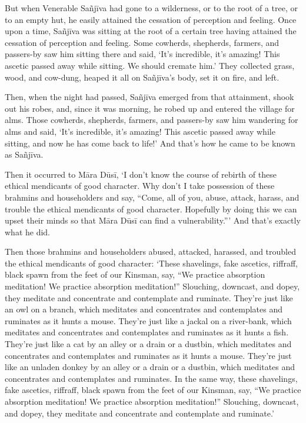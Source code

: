 \documentclass[12pt,openany]{book}%
\begin{document}
But when Venerable \textsanskrit{Sañjīva} had gone to a wilderness, or to the root of a tree, or to an empty hut, he easily attained the cessation of perception and feeling. Once upon a time, \textsanskrit{Sañjīva} was sitting at the root of a certain tree having attained the cessation of perception and feeling. Some cowherds, shepherds, farmers, and passers-by saw him sitting there and said, ‘It’s incredible, it’s amazing! This ascetic passed away while sitting. We should cremate him.’ They collected grass, wood, and cow-dung, heaped it all on \textsanskrit{Sañjīva}’s body, set it on fire, and left. 

Then, when the night had passed, \textsanskrit{Sañjīva} emerged from that attainment, shook out his robes, and, since it was morning, he robed up and entered the village for alms. Those cowherds, shepherds, farmers, and passers-by saw him wandering for alms and said, ‘It’s incredible, it’s amazing! This ascetic passed away while sitting, and now he has come back to life!’ And that’s how he came to be known as \textsanskrit{Sañjīva}. 

Then it occurred to \textsanskrit{Māra} \textsanskrit{Dūsī}, ‘I don’t know the course of rebirth of these ethical mendicants of good character. Why don’t I take possession of these brahmins and householders and say, “Come, all of you, abuse, attack, harass, and trouble the ethical mendicants of good character. Hopefully by doing this we can upset their minds so that \textsanskrit{Māra} \textsanskrit{Dūsī} can find a vulnerability.”’ And that’s exactly what he did. 

Then those brahmins and householders abused, attacked, harassed, and troubled the ethical mendicants of good character: ‘These shavelings, fake ascetics, riffraff, black spawn from the feet of our Kinsman, say, “We practice absorption meditation! We practice absorption meditation!” Slouching, downcast, and dopey, they meditate and concentrate and contemplate and ruminate. They’re just like an owl on a branch, which meditates and concentrates and contemplates and ruminates as it hunts a mouse. They’re just like a jackal on a river-bank, which meditates and concentrates and contemplates and ruminates as it hunts a fish. They’re just like a cat by an alley or a drain or a dustbin, which meditates and concentrates and contemplates and ruminates as it hunts a mouse. They’re just like an unladen donkey by an alley or a drain or a dustbin, which meditates and concentrates and contemplates and ruminates. In the same way, these shavelings, fake ascetics, riffraff, black spawn from the feet of our Kinsman, say, “We practice absorption meditation! We practice absorption meditation!” Slouching, downcast, and dopey, they meditate and concentrate and contemplate and ruminate.’ 
\end{document}
